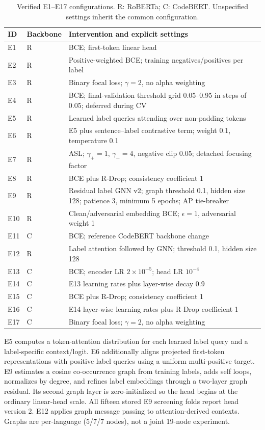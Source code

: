 \begin{table}[htbp]\centering\small
\caption{Verified E1--E17 configurations. R: RoBERTa; C: CodeBERT. Unspecified settings inherit the common configuration.}\label{tab:configs}
\begin{tabularx}{\linewidth}{llX}\toprule
ID & Backbone & Intervention and explicit settings\\\midrule
E1 & R & BCE; first-token linear head\\
E2 & R & Positive-weighted BCE; training negatives/positives per label\\
E3 & R & Binary focal loss; $\gamma=2$, no alpha weighting\\
E4 & R & BCE; final-validation threshold grid 0.05--0.95 in steps of 0.05; deferred during CV\\
E5 & R & Learned label queries attending over non-padding tokens\\
E6 & R & E5 plus sentence--label contrastive term; weight 0.1, temperature 0.1\\
E7 & R & ASL; $\gamma_+=1$, $\gamma_-=4$, negative clip 0.05; detached focusing factor\\
E8 & R & BCE plus R-Drop; consistency coefficient 1\\
E9 & R & Residual label GNN v2; graph threshold 0.1, hidden size 128; patience 3, minimum 5 epochs; AP tie-breaker\\
E10 & R & Clean/adversarial embedding BCE; $\epsilon=1$, adversarial weight 1\\
E11 & C & BCE; reference CodeBERT backbone change\\
E12 & R & Label attention followed by GNN; threshold 0.1, hidden size 128\\
E13 & C & BCE; encoder LR $2\times10^{-5}$; head LR $10^{-4}$\\
E14 & C & E13 learning rates plus layer-wise decay 0.9\\
E15 & C & BCE plus R-Drop; consistency coefficient 1\\
E16 & C & E14 layer-wise learning rates plus R-Drop coefficient 1\\
E17 & C & Binary focal loss; $\gamma=2$, no alpha weighting\\\bottomrule
\end{tabularx}\end{table}

E5 computes a token-attention distribution for each learned label query and a label-specific context/logit. E6 additionally aligns projected first-token representations with positive label queries using a uniform multi-positive target. E9 estimates a cosine co-occurrence graph from training labels, adds self loops, normalizes by degree, and refines label embeddings through a two-layer graph residual. Its second graph layer is zero-initialized so the head begins at the ordinary linear-head scale. All fifteen stored E9 screening folds report head version 2. E12 applies graph message passing to attention-derived contexts. Graphs are per-language (5/7/7 nodes), not a joint 19-node experiment.

